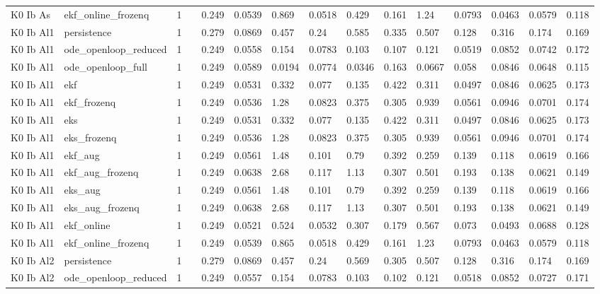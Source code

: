 \begin{table}[t]
\begin{tabular}{lllllllllllllll}
K0 Ib As & ekf\_online\_frozenq & 1 &  & 0.249 & 0.0539 & 0.869 & 0.0518 & 0.429 & 0.161 & 1.24 & 0.0793 & 0.0463 & 0.0579 & 0.118 \\
K0 Ib Al1 & persistence & 1 &  & 0.279 & 0.0869 & 0.457 & 0.24 & 0.585 & 0.335 & 0.507 & 0.128 & 0.316 & 0.174 & 0.169 \\
K0 Ib Al1 & ode\_openloop\_reduced & 1 &  & 0.249 & 0.0558 & 0.154 & 0.0783 & 0.103 & 0.107 & 0.121 & 0.0519 & 0.0852 & 0.0742 & 0.172 \\
K0 Ib Al1 & ode\_openloop\_full & 1 &  & 0.249 & 0.0589 & 0.0194 & 0.0774 & 0.0346 & 0.163 & 0.0667 & 0.058 & 0.0846 & 0.0648 & 0.115 \\
K0 Ib Al1 & ekf & 1 &  & 0.249 & 0.0531 & 0.332 & 0.077 & 0.135 & 0.422 & 0.311 & 0.0497 & 0.0846 & 0.0625 & 0.173 \\
K0 Ib Al1 & ekf\_frozenq & 1 &  & 0.249 & 0.0536 & 1.28 & 0.0823 & 0.375 & 0.305 & 0.939 & 0.0561 & 0.0946 & 0.0701 & 0.174 \\
K0 Ib Al1 & eks & 1 &  & 0.249 & 0.0531 & 0.332 & 0.077 & 0.135 & 0.422 & 0.311 & 0.0497 & 0.0846 & 0.0625 & 0.173 \\
K0 Ib Al1 & eks\_frozenq & 1 &  & 0.249 & 0.0536 & 1.28 & 0.0823 & 0.375 & 0.305 & 0.939 & 0.0561 & 0.0946 & 0.0701 & 0.174 \\
K0 Ib Al1 & ekf\_aug & 1 &  & 0.249 & 0.0561 & 1.48 & 0.101 & 0.79 & 0.392 & 0.259 & 0.139 & 0.118 & 0.0619 & 0.166 \\
K0 Ib Al1 & ekf\_aug\_frozenq & 1 &  & 0.249 & 0.0638 & 2.68 & 0.117 & 1.13 & 0.307 & 0.501 & 0.193 & 0.138 & 0.0621 & 0.149 \\
K0 Ib Al1 & eks\_aug & 1 &  & 0.249 & 0.0561 & 1.48 & 0.101 & 0.79 & 0.392 & 0.259 & 0.139 & 0.118 & 0.0619 & 0.166 \\
K0 Ib Al1 & eks\_aug\_frozenq & 1 &  & 0.249 & 0.0638 & 2.68 & 0.117 & 1.13 & 0.307 & 0.501 & 0.193 & 0.138 & 0.0621 & 0.149 \\
K0 Ib Al1 & ekf\_online & 1 &  & 0.249 & 0.0521 & 0.524 & 0.0532 & 0.307 & 0.179 & 0.567 & 0.073 & 0.0493 & 0.0688 & 0.128 \\
K0 Ib Al1 & ekf\_online\_frozenq & 1 &  & 0.249 & 0.0539 & 0.865 & 0.0518 & 0.429 & 0.161 & 1.23 & 0.0793 & 0.0463 & 0.0579 & 0.118 \\
K0 Ib Al2 & persistence & 1 &  & 0.279 & 0.0869 & 0.457 & 0.24 & 0.569 & 0.305 & 0.507 & 0.128 & 0.316 & 0.174 & 0.169 \\
K0 Ib Al2 & ode\_openloop\_reduced & 1 &  & 0.249 & 0.0557 & 0.154 & 0.0783 & 0.103 & 0.102 & 0.121 & 0.0518 & 0.0852 & 0.0727 & 0.171 \\

\end{tabular}
\end{table}
